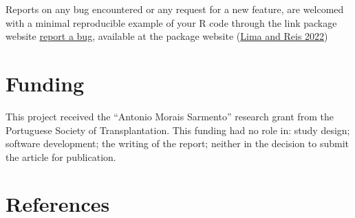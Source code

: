 \documentclass[
]{article}
\begin{document}
Reports on any bug encountered or any request for a new feature, are
welcomed with a minimal reproducible example of your R code through the
link package website
\href{https://github.com/txopen/histoc/issues}{report a bug}, available
at the package website (\protect\hyperlink{ref-histoc}{Lima and Reis
2022})

\hypertarget{funding}{%
\section{Funding}\label{funding}}

This project received the ``Antonio Morais Sarmento'' research grant
from the Portuguese Society of Transplantation. This funding had no role
in: study design; software development; the writing of the report;
neither in the decision to submit the article for publication.

\hypertarget{references}{%
\section*{References}\label{references}}
\end{document}
